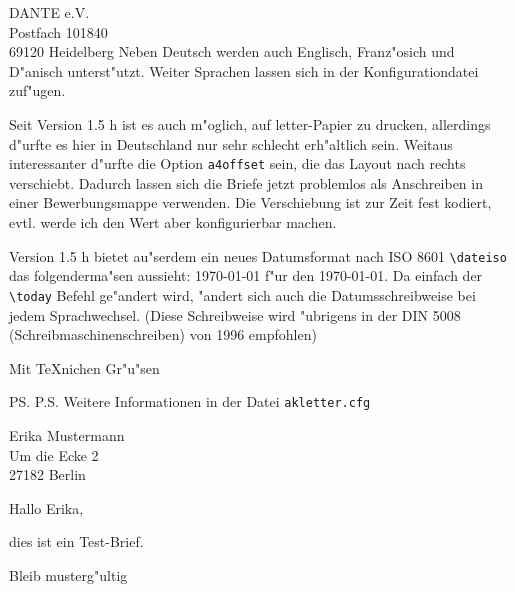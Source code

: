 \documentclass[%
foldmarks,
bankhigh,
banklow,
draft,
refdate,
twoside,
a4paper]
{akletter}
\begin{document}
\begin{letter}{DANTE e.V.\\Postfach 101840\\69120 Heidelberg}
Neben Deutsch werden auch Englisch, Franz"osich und D"anisch unterst"utzt. 
Weiter Sprachen lassen sich in der Konfigurationdatei zuf"ugen.

Seit Version 1.5 h ist es auch m"oglich, auf letter-Papier zu drucken,
allerdings d"urfte es hier in Deutschland nur sehr schlecht
erh"altlich sein. Weitaus interessanter d"urfte die Option
\texttt{a4offset} sein, die das Layout nach rechts verschiebt. Dadurch
lassen sich die Briefe jetzt problemlos als Anschreiben in einer
Bewerbungsmappe verwenden. Die Verschiebung ist zur Zeit fest kodiert,
evtl. werde ich den Wert aber konfigurierbar machen.

Version 1.5 h bietet au"serdem ein neues Datumsformat nach ISO 8601
\verb+\dateiso+ das folgenderma"sen aussieht: {\dateiso\today} f"ur
den {\dategerman\today}. Da einfach der \verb+\today+ Befehl ge"andert
wird, "andert sich auch die Datumsschreibweise bei jedem
Sprachwechsel. (Diese Schreibweise wird "ubrigens in der DIN 5008
(Schreibmaschinenschreiben) von 1996 empfohlen)

\closing{Mit \TeX nichen Gr"u"sen}


\ps P.S. Weitere Informationen in der Datei \verb|akletter.cfg|
\end{letter}


\begin{letter}{Erika Mustermann\\Um die Ecke 2\\[0.5ex] 27182 
Berlin}
 \signature{\vspace{-1cm} Extra large Sig.\\ Could be a picture 
 with your \emph{real} signature.\\(Axel Kielhorn) }
\subject{Dummy Brief}
\opening{Hallo Erika,}

dies ist ein Test-Brief.

\closing{Bleib musterg"ultig}
\end{letter}
\end{document}

